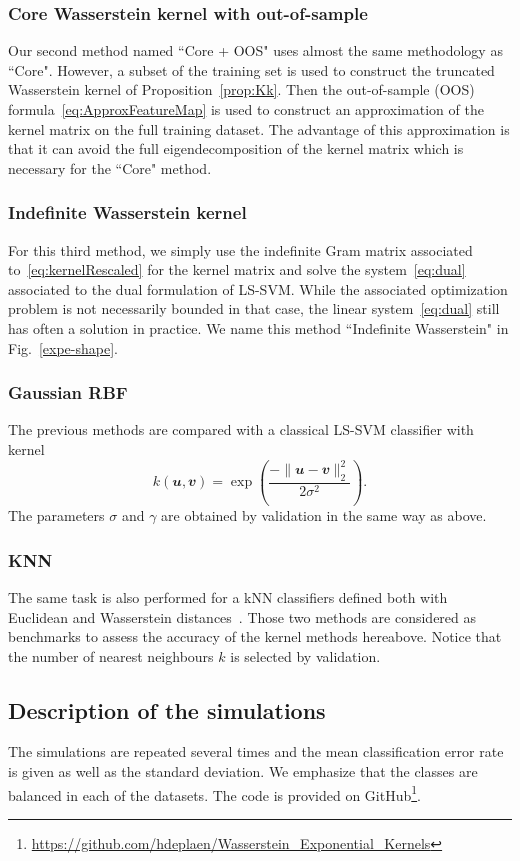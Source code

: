 \subsubsection{Core Wasserstein kernel with out-of-sample}
Our second method named ``Core + OOS" uses almost the same methodology as ``Core". However, a subset of the training set is used to construct the truncated Wasserstein kernel of Proposition~\ref{prop:Kk}. Then the out-of-sample (OOS) formula~\eqref{eq:ApproxFeatureMap} is used to construct an approximation of the kernel matrix on the full training dataset. The advantage of this approximation is that it can avoid the full eigendecomposition of the kernel matrix which is necessary for the ``Core" method.
\subsubsection{Indefinite Wasserstein kernel}
 For this third method, we simply use the indefinite Gram matrix associated to~\eqref{eq:kernelRescaled} for the kernel matrix and solve the system~\eqref{eq:dual} associated to the dual formulation of LS-SVM. While the associated optimization problem is not necessarily bounded in that case, the linear system~\eqref{eq:dual} still has often a solution in practice. We name this method ``Indefinite Wasserstein" in Fig.~\ref{expe-shape}.
\subsubsection{Gaussian RBF}
The previous methods are compared with a classical LS-SVM classifier with kernel
\[
k(\mathbfit{u},\mathbfit{v}) = \exp\left( \dfrac{-\|\mathbfit{u}-\mathbfit{v}\|_2^2}{2\sigma^2} \right).
\]
The parameters $\sigma$ and $\gamma$ are obtained by validation in the same way as above.
\subsubsection{KNN}
The same task is also performed for a kNN classifiers defined both with Euclidean and Wasserstein distances~\cite{KNN_OT}. Those two methods are considered as benchmarks to assess the accuracy of the kernel methods hereabove. Notice that the number of nearest neighbours $k$ is selected by validation.
\subsection{Description of the simulations}
The simulations are repeated several times and the mean classification error rate is given as well as the standard deviation. We emphasize that the classes are balanced in each of the datasets. The code is provided on GitHub\footnote{\url{https://github.com/hdeplaen/Wasserstein_Exponential_Kernels}}.

